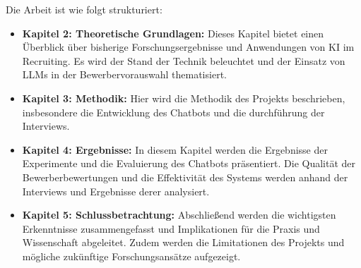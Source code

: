 Die Arbeit ist wie folgt strukturiert:

\begin{itemize}
    \item \textbf{Kapitel 2: Theoretische Grundlagen:} Dieses Kapitel bietet einen Überblick über bisherige Forschungsergebnisse und Anwendungen von KI im Recruiting. 
    Es wird der Stand der Technik beleuchtet und der Einsatz von LLMs in der Bewerbervorauswahl thematisiert.
    
    \item \textbf{Kapitel 3: Methodik:} Hier wird die Methodik des Projekts beschrieben, insbesondere die Entwicklung des Chatbots und die durchführung der Interviews. 

    
    \item \textbf{Kapitel 4: Ergebnisse:} In diesem Kapitel werden die Ergebnisse der Experimente und die Evaluierung des Chatbots präsentiert. 
    Die Qualität der Bewerberbewertungen und die Effektivität des Systems werden anhand der Interviews und Ergebnisse derer analysiert.
    
    \item \textbf{Kapitel 5: Schlussbetrachtung:} Abschließend werden die wichtigsten Erkenntnisse zusammengefasst und Implikationen für die Praxis und Wissenschaft abgeleitet. 
    Zudem werden die Limitationen des Projekts und mögliche zukünftige Forschungsansätze aufgezeigt.
\end{itemize}
